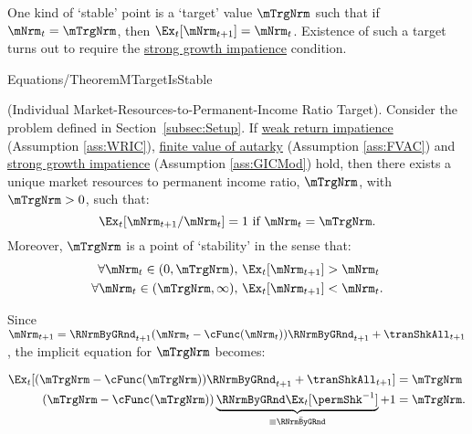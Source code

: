 \documentclass[BufferStockTheory]{subfiles}
\begin{document}
One kind of `stable' point is a `target' value $\mTrgNrm$ such that if $\mNrm_{t}=\mTrgNrm$, then $\Ex_{t}[\mNrm_{t+1}]=\mNrm_{t}$.
Existence of such a target turns out to require the \hyperlink{GICMod}{strong growth impatience} condition.

\begin{verbatimwrite}{Equations/TheoremMTargetIsStable}
  \begin{theorem}\label{thm:target} (Individual Market-Resources-to-Permanent-Income Ratio Target).
    Consider the problem defined in Section~\ref{subsec:Setup}.
If \hyperlink{WRIC}{weak return impatience} (Assumption \ref{ass:WRIC}), \hyperlink{FVAC}{finite value of autarky} (Assumption \ref{ass:FVAC}) and \hyperlink{GICMod}{strong growth impatience} (Assumption \ref{ass:GICMod}) hold, then there exists a unique market resources to permanent income ratio, $\mTrgNrm$, with $\mTrgNrm>0$, such that:
    \begin{equation}
      \Ex_t [{\mNrm}_{t+1}/\mNrm_t] = 1 \mbox{~if~} \mNrm_t = \mTrgNrm.
      \label{eq:mTarget} %
    \end{equation}
    Moreover, $\mTrgNrm$ is a point of `stability' in the sense that:
    \begin{equation}
      \label{eq:stability} %
      \begin{split}
        \forall {\mNrm}_t\in(0,\mTrgNrm),      \,\,& \Ex_t [{\mNrm}_{t+1}] > {\mNrm}_t  \\
        \forall {\mNrm}_t\in(\mTrgNrm,\infty), \,\,& \Ex_t [{\mNrm}_{t+1}] < {\mNrm}_t.
      \end{split}
    \end{equation}
  \end{theorem}
\end{verbatimwrite}




\hypertarget{mTargImplicit}{}
Since $\mNrm_{t+1}=\RNrmByGRnd_{t+1}(\mNrm_{t}-\cFunc(\mNrm_{t}))\RNrmByGRnd_{t+1}+\tranShkAll_{t+1}$, the implicit equation for $\mTrgNrm$ becomes:

\begin{equation} \label{eq:mTargImplicit}
  \begin{split}
    \Ex_{t} [(\mTrgNrm-\cFunc(\mTrgNrm))\RNrmByGRnd_{t+1}+\tranShkAll_{t+1}] & = \mTrgNrm     \\   (\mTrgNrm-\cFunc(\mTrgNrm))\underbrace{\RNrmByGRnd\Ex_{t}[\permShk^{-1}]}_{\equiv \bar{\RNrmByGRnd}}+1 & = \mTrgNrm .
  \end{split}
\end{equation}
\end{document}
